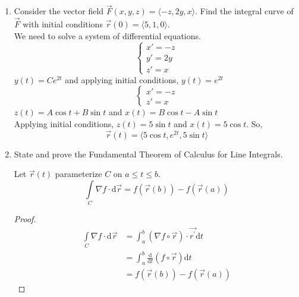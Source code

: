 \begin{enumerate}
	\item Consider the vector field $\vec{F}(x,y,z) = \langle -z, 2y, x \rangle$. Find the integral curve of $\vec{F}$ with initial conditions $\vec{r}(0) = \langle 5, 1, 0\rangle$.\\
	\indent
	We need to solve a system of differential equations.
	\begin{equation*}
		\begin{cases}
			x' = -z \\
			y' = 2y \\
			z' = x
		\end{cases}	
	\end{equation*}
	$y(t) = Ce^{2t}$ and applying initial conditions, $y(t) = e^{2t}$
	\begin{equation*}
		\begin{cases}
			x' = -z \\
			z' = x
		\end{cases}
	\end{equation*}
	$z(t) = A\cos{t} + B\sin{t}$ and $x(t) = B\cos{t} - A\sin{t}$\\
	Applying initial conditions, $z(t) = 5\sin{t}$ and $x(t) = 5\cos{t}$. So, 
	\begin{equation*}
		\vec{r}(t) = \langle 5\cos{t}, e^{2t}, 5\sin{t}\rangle	
	\end{equation*}
	
	\item State and prove the Fundamental Theorem of Calculus for Line Integrals.\\
	\begin{theorem}
		Let $\vec{r}(t)$ parameterize $C$ on $a \leq t \leq b$.
		\begin{equation*}
			\int\limits_{C}{\nabla f \cdot \mathrm{d}\vec{r}} = f(\vec{r}(b)) - f(\vec{r}(a))
		\end{equation*}
	\end{theorem}
	\begin{proof}
		\begin{align*}
			\int\limits_{C}{\nabla f \cdot \mathrm{d}\vec{r}} &= \int_{a}^{b}{(\nabla f\circ\vec{r}) \cdot \vec{r^\prime}\mathrm{d}t} \\
			&= \int_{a}^{b}{\frac{\mathrm{d}}{\mathrm{d}t}(f\circ\vec{r})\mathrm{d}t} \\
			&= f(\vec{r}(b)) - f(\vec{r}(a))		
		\end{align*}
	\end{proof}
\end{enumerate}